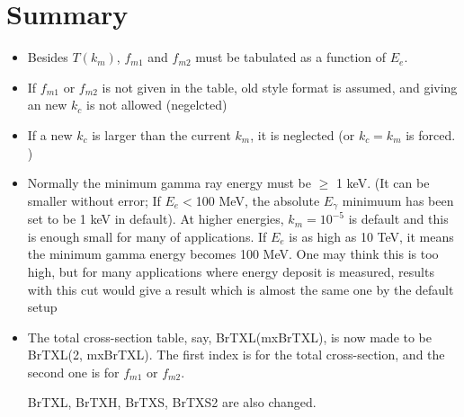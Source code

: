 \documentclass[a4paper]{article}
\begin{document}
  \section{Summary}
  \begin{itemize}
   \item Besides $T(k_m)$, $f_{m1}$ and $f_{m2}$ must be tabulated as
	 a function of  $E_e$.
   \item If  $f_{m1}$ or $f_{m2}$ is not given in the table, old style
	 format is
	 assumed, and giving an new $k_c$ is not allowed (negelcted)
   \item  If a new $k_c$ is larger than the current $k_m$,  it is
	  neglected
	  (or $k_c=k_m$ is forced. )
	 
   \item Normally the minimum gamma ray energy must be $\ge$ 1 keV.
	 (It can be smaller without error;
	 If $E_e<$100 MeV,
	  the absolute
	 $E_\gamma$ minimuum has been  set to be 1 keV in default).
	 At higher energies, $k_m=10^{-5}$ is default and this is
	 enough small for many of applications.  If $E_e$ is as
	 high as 10 TeV, it means the minimum gamma energy becomes
	 100 MeV. One may think this is too high, but for many
	 applications where energy deposit is measured,  results
	 with this cut would give a result which is almost the
	 same one by the default setup
   	 
   \item The total cross-section table, say, BrTXL(mxBrTXL),
	 is now made to be BrTXL(2, mxBrTXL).  The first index is
	 for the total cross-section, and the second one is
	 for $f_{m1}$ or $f_{m2}$.

	 BrTXL, BrTXH, BrTXS, BrTXS2 are also changed.
	 
  \end{itemize}
\end{document}

